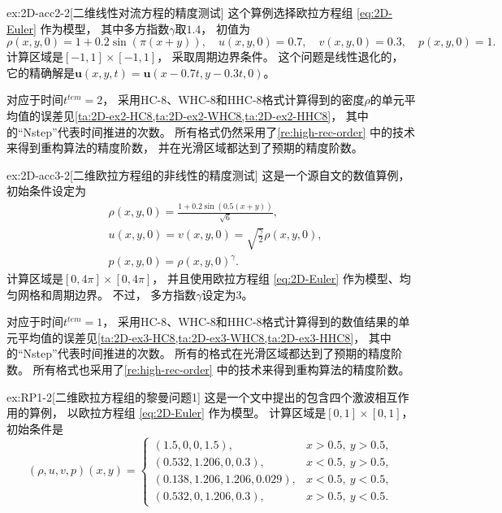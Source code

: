 

\begin{exampleRe}{ex:2D-acc2}{-2}[二维线性对流方程的精度测试]
  \label{ex:2D-acc2-re}
  这个算例选择欧拉方程组 \cref{eq:2D-Euler} 作为模型，
  其中多方指数$\gamma$取$1.4$，
  初值为
  \begin{equation}
    \rho(x,y,0) = 1 + 0.2\sin(\pi(x+y)), \quad u(x,y,0)=0.7, \quad v(x,y,0)=0.3, \quad p(x,y,0)=1.
  \end{equation}
  计算区域是$[-1,1]\times[-1,1]$，
  采取周期边界条件。
  这个问题是线性退化的，
  它的精确解是${\bm{u}}(x,y,t) = {\bm{u}}(x-0.7t,y-0.3t,0)$。
\end{exampleRe}

对应于时间$t^{tem}=2$，
采用HC-8、WHC-8和HHC-8格式计算得到的密度$\rho$的单元平均值的误差见\cref{ta:2D-ex2-HC8,ta:2D-ex2-WHC8,ta:2D-ex2-HHC8}，
其中的“Nstep”代表时间推进的次数。
所有格式仍然采用了\cref{re:high-rec-order} 中的技术来得到重构算法的精度阶数，
并在光滑区域都达到了预期的精度阶数。



\begin{exampleRe}{ex:2D-acc3}{-2}[二维欧拉方程组的非线性的精度测试]
  \label{ex:2D-acc3-re}
  这是一个源自文\cite{Gamma3-HWENO}的数值算例，
  初始条件设定为
  \begin{align}
     & \rho(x, y, 0)=\frac{1+0.2\sin(0.5(x+y)) }{\sqrt{6}},        \\
     & u(x, y, 0)=v(x, y, 0)=\sqrt{\frac{\gamma}{2}}\rho(x, y, 0), \\
     & p(x, y, 0)=\rho(x, y, 0)^\gamma.
  \end{align}
  计算区域是$[0, 4\pi]\times[0, 4\pi]$，
  并且使用欧拉方程组 \cref{eq:2D-Euler} 作为模型、均匀网格和周期边界。
  不过，
  多方指数$\gamma$设定为3。
\end{exampleRe}

对应于时间$t^{tem}=1$，
采用HC-8、WHC-8和HHC-8格式计算得到的数值结果的单元平均值的误差见\cref{ta:2D-ex3-HC8,ta:2D-ex3-WHC8,ta:2D-ex3-HHC8}，
其中的“Nstep”代表时间推进的次数。
所有的格式在光滑区域都达到了预期的精度阶数。
所有格式也采用了\cref{re:high-rec-order} 中的技术来得到重构算法的精度阶数。



\begin{exampleRe}{ex:RP1}{-2}[二维欧拉方程组的黎曼问题1]
  \label{ex:RP1-re}
  这是一个文\cite{RPexample}中提出的包含四个激波相互作用的算例，
  以欧拉方程组 \cref{eq:2D-Euler} 作为模型。
  计算区域是$[0,1]\times[0,1]$，
  初始条件是
  \begin{equation}
    (\rho, u, v, p) (x, y)=
    \begin{cases}
      (1.5, 0, 0, 1.5),             & x>0.5,~y>0.5,  \\
      (0.532, 1.206, 0, 0.3),       & x<0.5,~y>0.5,  \\
      (0.138, 1.206, 1.206, 0.029), & x<0.5,~y<0.5,  \\
      (0.532, 0, 1.206, 0.3),       & x>0.5,~y<0.5.
    \end{cases}
  \end{equation}
\end{exampleRe}

